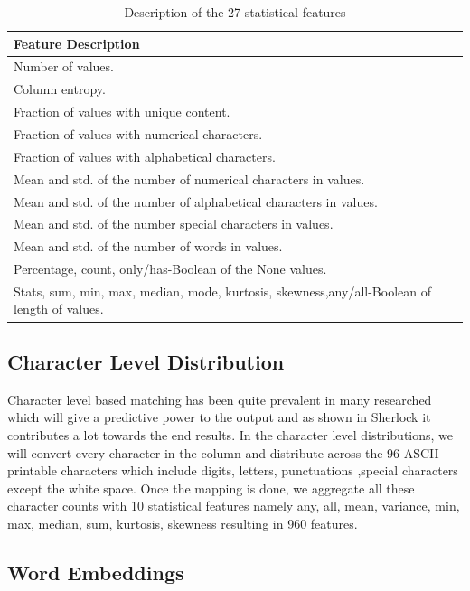 \documentclass[12pt, a4paper]{report}
\theoremstyle{definition}
\numberwithin{equation}{chapter}
\numberwithin{figure}{chapter}
\numberwithin{table}{chapter}
\begin{document}
\begin{spacing}{1.5}
\begin{table}[H]
\begin{tabular}{l} 
\hline
\textbf{Feature Description} \\
\hline
Number of values. \\ 
Column entropy. \\ 
Fraction of values with unique content. \\ 
Fraction of values with numerical characters. \\ 
Fraction of values with alphabetical characters. \\ 
Mean and std. of the number of numerical characters in values. \\ 
Mean and std. of the number of alphabetical characters in values. \\ 
Mean and std. of the number special characters in values. \\ 
Mean and std. of the number of words in values. \\ 
{Percentage, count, only/has-Boolean} of the None values. \\ 
{Stats, sum, min, max, median, mode, kurtosis, skewness,any/all-Boolean} of length of values. \\ 
\hline
\end{tabular}
\caption{Description of the 27 statistical features}
\label{table:1}
\end{table}


\subsection{Character Level Distribution}
\label{ssec:char}

Character level based matching has been quite prevalent in many researched which will give a predictive power to the output and as shown in Sherlock \cite{sherlock} it contributes a lot towards the end results. 
In the character level distributions, we will convert every character in the column and distribute across the 96 ASCII-printable characters which include digits, letters, punctuations ,special characters except the white space. Once the mapping is done, we aggregate all these character counts with 10 statistical features namely any, all, mean, variance, min, max, median, sum, kurtosis, skewness resulting in 960 features.

\subsection{Word Embeddings}
\label{ssec:word}


\end{spacing}
\end{document}
